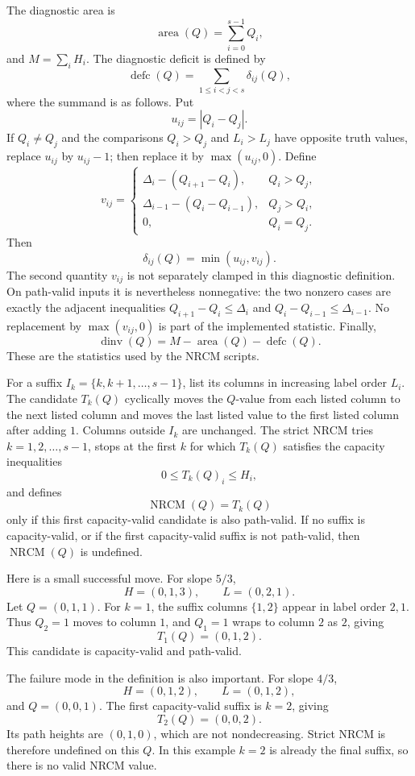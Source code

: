 \documentclass{article}
\newcommand{\defc}{\operatorname{defc}}
\newcommand{\dinv}{\operatorname{dinv}}
\newcommand{\area}{\operatorname{area}}
\newcommand{\NRCM}{\operatorname{NRCM}}
\begin{document}
The diagnostic area is
\[
  \area(Q)=\sum_{i=0}^{s-1}Q_i,
\]
and \(M=\sum_i H_i\).  The diagnostic deficit is defined by
\[
  \defc(Q)=\sum_{1\le i<j<s}\delta_{ij}(Q),
\]
where the summand is as follows.  Put
\[
  u_{ij}=|Q_i-Q_j|.
\]
If \(Q_i\ne Q_j\) and the comparisons \(Q_i>Q_j\) and \(L_i>L_j\) have
opposite truth values, replace \(u_{ij}\) by \(u_{ij}-1\); then replace it by
\(\max(u_{ij},0)\).  Define
\[
  v_{ij}=
  \begin{cases}
    \Delta_i-(Q_{i+1}-Q_i), & Q_i>Q_j,\\
    \Delta_{i-1}-(Q_i-Q_{i-1}), & Q_j>Q_i,\\
    0, & Q_i=Q_j.
  \end{cases}
\]
Then
\[
  \delta_{ij}(Q)=\min(u_{ij},v_{ij}).
\]
The second quantity \(v_{ij}\) is not separately clamped in this diagnostic
definition.  On path-valid inputs it is nevertheless nonnegative: the two
nonzero cases are exactly the adjacent inequalities
\(Q_{i+1}-Q_i\le\Delta_i\) and \(Q_i-Q_{i-1}\le\Delta_{i-1}\).  No replacement
by \(\max(v_{ij},0)\) is part of the implemented statistic.
Finally,
\[
  \dinv(Q)=M-\area(Q)-\defc(Q).
\]
These are the statistics used by the NRCM scripts.

For a suffix \(I_k=\{k,k+1,\ldots,s-1\}\), list its columns in increasing
label order \(L_i\).  The candidate \(T_k(Q)\) cyclically moves the \(Q\)-value
from each listed column to the next listed column and moves the last listed
value to the first listed column after adding \(1\).  Columns outside \(I_k\)
are unchanged.  The strict NRCM tries \(k=1,2,\ldots,s-1\), stops at the first
\(k\) for which \(T_k(Q)\) satisfies the capacity inequalities
\[
  0\le T_k(Q)_i\le H_i,
\]
and defines
\[
  \NRCM(Q)=T_k(Q)
\]
only if this first capacity-valid candidate is also path-valid.  If no suffix
is capacity-valid, or if the first capacity-valid suffix is not path-valid,
then \(\NRCM(Q)\) is undefined.

Here is a small successful move.  For slope \(5/3\),
\[
  H=(0,1,3),\qquad L=(0,2,1).
\]
Let \(Q=(0,1,1)\).  For \(k=1\), the suffix columns \(\{1,2\}\) appear in
label order \(2,1\).  Thus \(Q_2=1\) moves to column \(1\), and \(Q_1=1\)
wraps to column \(2\) as \(2\), giving
\[
  T_1(Q)=(0,1,2).
\]
This candidate is capacity-valid and path-valid.

The failure mode in the definition is also important.  For slope \(4/3\),
\[
  H=(0,1,2),\qquad L=(0,1,2),
\]
and \(Q=(0,0,1)\).  The first capacity-valid suffix is \(k=2\), giving
\[
  T_2(Q)=(0,0,2).
\]
Its path heights are \((0,1,0)\), which are not nondecreasing.  Strict NRCM is
therefore undefined on this \(Q\).  In this example \(k=2\) is already the
final suffix, so there is no valid NRCM value.
\end{document}
